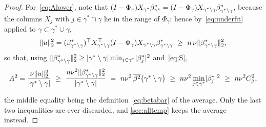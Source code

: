 \begin{proof}
    For~\eqref{eq:Alower}, note that
    $(I-\Phi_\gamma)X_{\gamma^{\ast}}\beta^{\ast}_{\gamma^{\ast}}=(I-\Phi_\gamma)
    X_{\gamma^{\ast}\setminus\gamma}
    \beta^\ast_{\gamma^{\ast}\setminus\gamma}$, because the columns $X_j$
    with $j\in\gamma^{\ast}\cap\gamma$ lie in the range of $\Phi_\gamma$;
    hence by~\eqref{eq:underfit} applied to
    $\gamma\subset\gamma^{\ast}\cup\gamma$,
    \begin{equation}
        \label{eq:usquare}
        \lVert u\rVert_2^{2}
        =(\beta^\ast_{\gamma^{\ast}\setminus\gamma})^{\top}
        X_{\gamma^{\ast}\setminus\gamma}^{\top}(I-\Phi_\gamma)
        X_{\gamma^{\ast}\setminus\gamma}
        \beta^\ast_{\gamma^{\ast}\setminus\gamma}
        \ \geq\ n\,\nu
        \lVert\beta^\ast_{\gamma^{\ast}\setminus\gamma}\rVert_2^{2},
    \end{equation}
    so that, using
    $\lVert\beta^\ast_{\gamma^{\ast}\setminus\gamma}\rVert_2^{2}
    \geq\lvert\gamma^{\ast}\setminus\gamma\rvert
    \min_{j\in\gamma^{\ast}}\lvert\beta^\ast_j\rvert^{2}$ and~\eqref{eq:S},
    \begin{equation}
        \label{eq:Achain}
        A^{2}=\frac{\nu\lVert u\rVert_2^{2}}
        {\lvert\gamma^{\ast}\setminus\gamma\rvert}
        \ \geq\ \frac{n\nu^{2}
            \lVert\beta^\ast_{\gamma^{\ast}\setminus\gamma}\rVert_2^{2}}
        {\lvert\gamma^{\ast}\setminus\gamma\rvert}
        \ =\ n\nu^{2}\,\overline{\beta^{2}}\bigl(\gamma^{\ast}\setminus\gamma\bigr)
        \ \geq\ n\nu^{2}\min_{j\in\gamma^{\ast}}
        \lvert\beta^\ast_j\rvert^{2}
        \ \geq\ n\nu^{2}C_\beta^{2} ,
    \end{equation}

    the middle equality being the definition~\eqref{eq:betabar} of the
    average. Only the last two inequalities are ever discarded, and
    \cref{sec:alltemp} keeps the average instead.


\end{proof}
